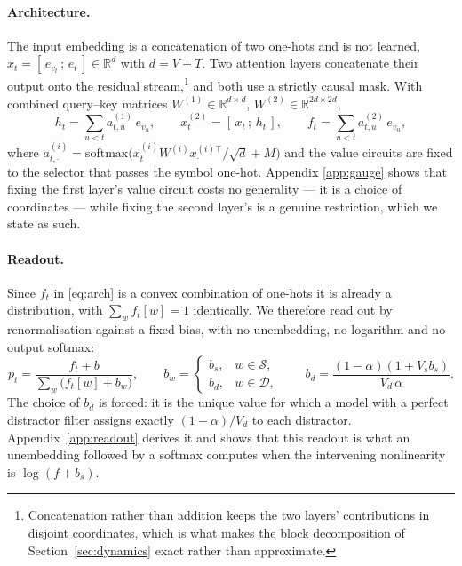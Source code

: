 \paragraph{Architecture.}
The input embedding is a concatenation of two one-hots and is not learned,
$x_t=[\,e_{v_t}\,;\,e_t\,]\in\mathbb{R}^{d}$ with $d=V+T$. Two attention layers concatenate their
output onto the residual stream,\footnote{Concatenation rather than addition keeps the two layers'
contributions in disjoint coordinates, which is what makes the block decomposition of
Section~\ref{sec:dynamics} exact rather than approximate.} and both use a strictly causal mask.
With combined query--key matrices $W^{(1)}\in\mathbb{R}^{d\times d}$,
$W^{(2)}\in\mathbb{R}^{2d\times 2d}$,
\begin{equation}
h_t=\sum_{u<t} a^{(1)}_{t,u}\,e_{v_u},\qquad
x^{(2)}_t=[\,x_t\,;\,h_t\,],\qquad
f_t=\sum_{u<t} a^{(2)}_{t,u}\,e_{v_u},
\label{eq:arch}
\end{equation}
where $a^{(i)}_{t,\cdot}=\mathrm{softmax}\bigl(x^{(i)}_tW^{(i)}x^{(i)\top}_{\cdot}/\sqrt d+M\bigr)$
and the value circuits are fixed to the selector that passes the symbol one-hot. Appendix
\ref{app:gauge} shows that fixing the first layer's value circuit costs no generality --- it is a
choice of coordinates --- while fixing the second layer's is a genuine restriction, which we
state as such.

\paragraph{Readout.}
Since $f_t$ in \eqref{eq:arch} is a convex combination of one-hots it is already a distribution,
with $\sum_w f_t[w]=1$ identically. We therefore read out by renormalisation against a fixed
bias, with no unembedding, no logarithm and no output softmax:
\begin{equation}
p_t=\frac{f_t+b}{\sum_w\bigl(f_t[w]+b_w\bigr)},\qquad
b_w=\begin{cases} b_s, & w\in\mathcal{S},\\ b_d, & w\in\mathcal{D},\end{cases}
\qquad
b_d=\frac{(1-\alpha)(1+V_s b_s)}{V_d\,\alpha}.
\label{eq:readout}
\end{equation}
The choice of $b_d$ is forced: it is the unique value for which a model with a perfect distractor
filter assigns exactly $(1-\alpha)/V_d$ to each distractor. Appendix~\ref{app:readout} derives it
and shows that this readout is what an unembedding followed by a softmax computes when the
intervening nonlinearity is $\log(f+b_s)$.

